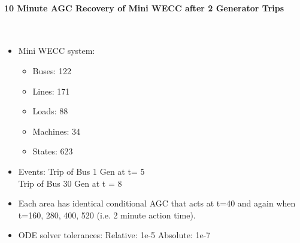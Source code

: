 \documentclass[12pt]{article}
\begin{document}
\onehalfspacing
\paragraph{10 Minute AGC Recovery of Mini WECC after 2 Generator Trips} \ \\

\begin{minipage}{0.47\linewidth}
\begin{itemize}
\item Mini WECC system:
\begin{itemize}
 em
\small
\item Buses: 122
\item Lines: 171
\item Loads: 88
\item Machines: 34
\item States: 623
\end{itemize}
\item Events: Trip of Bus 1 Gen at t= 5\\ Trip of Bus 30 Gen at t = 8

\item Each area has identical conditional AGC that acts at t=40 and again when t=160, 280, 400, 520 (i.e. 2 minute action time).

\item ODE solver tolerances:
\subitem Relative: 1e-5
\subitem Absolute: 1e-7

\end{itemize}
\vfill
\end{minipage}\hspace{2em}%
\end{document}
